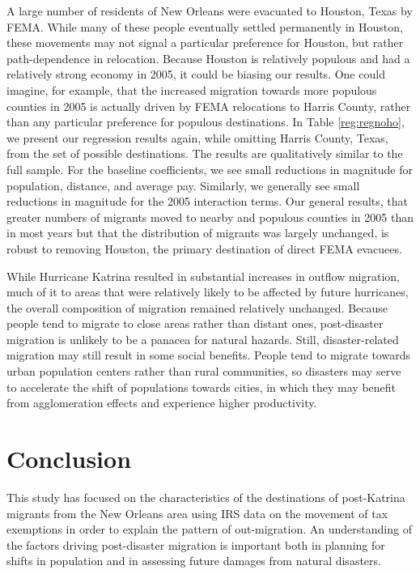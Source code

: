 \documentclass[]{article}
\begin{document}
A large number of residents of New Orleans were evacuated to Houston,
Texas by FEMA. While many of these people eventually settled permanently
in Houston, these movements may not signal a particular preference for
Houston, but rather path-dependence in relocation. Because Houston is
relatively populous and had a relatively strong economy in 2005, it
could be biasing our results. One could imagine, for example, that the
increased migration towards more populous counties in 2005 is actually
driven by FEMA relocations to Harris County, rather than any particular
preference for populous destinations. In Table \ref{reg:regnoho}, we
present our regression results again, while omitting Harris County,
Texas, from the set of possible destinations. The results are
qualitatively similar to the full sample. For the baseline coefficients,
we see small reductions in magnitude for population, distance, and
average pay. Similarly, we generally see small reductions in magnitude
for the 2005 interaction terms. Our general results, that greater
numbers of migrants moved to nearby and populous counties in 2005 than
in most years but that the distribution of migrants was largely
unchanged, is robust to removing Houston, the primary destination of
direct FEMA evacuees.

While Hurricane Katrina resulted in substantial increases in outflow
migration, much of it to areas that were relatively likely to be
affected by future hurricanes, the overall composition of migration
remained relatively unchanged. Because people tend to migrate to close
areas rather than distant ones, post-disaster migration is unlikely to
be a panacea for natural hazards. Still, disaster-related migration may
still result in some social benefits. People tend to migrate towards
urban population centers rather than rural communities, so disasters may
serve to accelerate the shift of populations towards cities, in which
they may benefit from agglomeration effects and experience higher
productivity.

\section{\texorpdfstring{Conclusion
\label{sec:conclusion}}{Conclusion }}\label{conclusion}

This study has focused on the characteristics of the destinations of
post-Katrina migrants from the New Orleans area using IRS data on the
movement of tax exemptions in order to explain the pattern of
out-migration. An understanding of the factors driving post-disaster
migration is important both in planning for shifts in population and in
assessing future damages from natural disasters.
\end{document}
